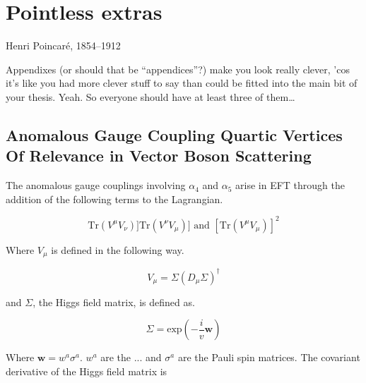 \chapter{Pointless extras}
\label{app:Pointless}

%
{Henri Poincar\'e, 1854--1912}

Appendixes (or should that be ``appendices''?) make you look really clever, 'cos
it's like you had more clever stuff to say than could be fitted into the main
bit of your thesis. Yeah. So everyone should have at least three of them\dots

\section{Anomalous Gauge Coupling Quartic Vertices Of Relevance in Vector Boson Scattering}
\label{sec:expansionalpha4alpha5}

The anomalous gauge couplings involving $\alpha_{4}$ and $\alpha_{5}$ arise in EFT through the addition of the following terms to the Lagrangian.

\begin{equation}
\text{Tr}(V^{\mu}V_{\nu})] \text{Tr}(V^{\nu}V_{\mu})] \text{ and } [\text{Tr}(V^{\mu}V_{\mu})]^{2} 
\end{equation}

Where $V_{\mu}$ is defined in the following way.

\begin{equation}
V_{\mu} = \Sigma(D_{\mu}\Sigma)^{\dagger}
\end{equation}

and $\Sigma$, the Higgs field matrix, is defined as. 

\begin{equation}
\Sigma = \text{exp}(-\frac{i}{v}\textbf{w})
\end{equation}

Where $\textbf{w} = w^{a} \sigma^{a}$.  $w^{a}$ are the ... and $\sigma^{a}$ are the Pauli spin matrices.  The covariant derivative of the Higgs field matrix is

